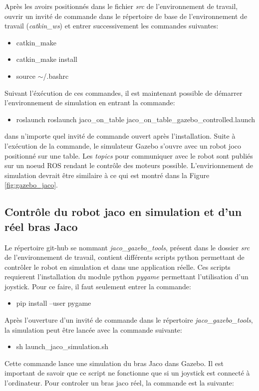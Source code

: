 \documentclass[root.tex]{subfiles}
\begin{document}
Après les avoirs positionnés dans le fichier \textit{src} de l'environnement de travail, ouvrir un invité de commande dans le répertoire de base de l'environnement de travail (\textit{catkin\_ws}) et entrer successivement les commandes suivantes:

\begin{itemize}
\item catkin\_make
\item catkin\_make install
\item source $\sim$/.bashrc
\end{itemize}

Suivant l'éxécution de ces commandes, il est maintenant possible de démarrer l'environnement de simulation en entrant la commande:
\begin{itemize}
\item roslaunch roslaunch jaco\_on\_table jaco\_on\_table\_gazebo\_controlled.launch
\end{itemize}
dans n'importe quel invité de commande ouvert après l'installation. 
Suite à l'exécution de la commande, le simulateur Gazebo s'ouvre avec un robot joco positionné sur une table.
Les \textit{topics} pour communiquer avec le robot sont publiés sur un noeud ROS rendant le contrôle des moteurs possible.
L'envirionnement de simulation devrait être similaire à ce qui est montré dans la Figure \ref{fig:gazebo_jaco}.

\subsection{Contrôle du robot jaco en simulation et d'un réel bras Jaco}

Le répertoire git-hub se nommant \textit{jaco\_gazebo\_tools}, présent dans le dossier \textit{src} de l'environnement de travail, contient différents scripts python permettant de contrôler le robot en simulation et dans une application réelle.
Ces scripts requierent l'installation du module python \textit{pygame} permettant l'utilisation d'un joystick.
Pour ce faire, il faut seulement entrer la commande:
\begin{itemize}
\item pip install --user pygame
\end{itemize}
Après l'ouverture d'un invité de commande dans le répertoire \textit{jaco\_gazebo\_tools}, la simulation peut être lancée avec la commande suivante:
\begin{itemize}
\item sh launch\_jaco\_simulation.sh
\end{itemize}
Cette commande lance une simulation du bras Jaco dans Gazebo.
Il est important de savoir que ce script ne fonctionne que si un joystick est connecté à l'ordinateur.
Pour controler un bras jaco réel, la commande est la suivante:
\end{document}
